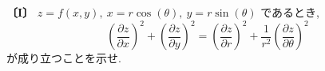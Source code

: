 \noindent\textbf{〔I〕}
$z=f(x,y),\ x=r\cos(\theta),\ y=r\sin(\theta)$ であるとき,
\[
\left(\frac{\partial z}{\partial x}\right)^2+\left(\frac{\partial z}{\partial y}\right)^2
=\left(\frac{\partial z}{\partial r}\right)^2+\frac{1}{r^2}\left(\frac{\partial z}{\partial \theta}\right)^2
\]
が成り立つことを示せ.
